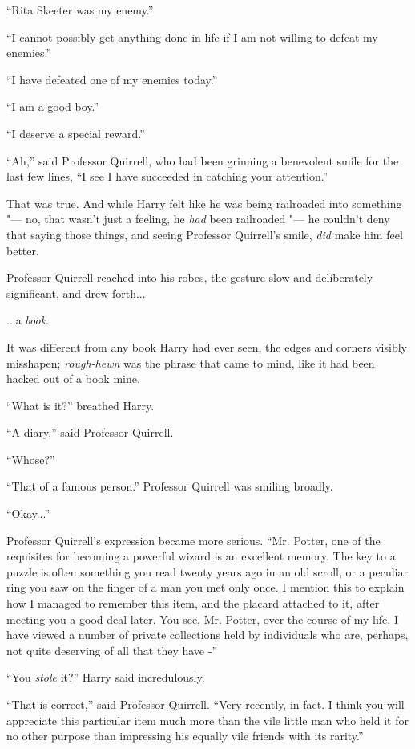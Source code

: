``Rita Skeeter was my enemy.''

``I cannot possibly get anything done in life if I am not willing to
defeat my enemies.''

``I have defeated one of my enemies today.''

``I am a good boy.''

``I deserve a special reward.''

``Ah,'' said Professor Quirrell, who had been grinning a benevolent
smile for the last few lines, ``I see I have succeeded in catching your
attention.''

That was true. And while Harry felt like he was being railroaded into
something "--- no, that wasn't just a feeling, he \emph{had} been
railroaded "--- he couldn't deny that saying those things, and seeing
Professor Quirrell's smile, \emph{did} make him feel better.

Professor Quirrell reached into his robes, the gesture slow and
deliberately significant, and drew forth...

...a \emph{book}.

It was different from any book Harry had ever seen, the edges and
corners visibly misshapen; \emph{rough-hewn} was the phrase that came to
mind, like it had been hacked out of a book mine.

``What is it?'' breathed Harry.

``A diary,'' said Professor Quirrell.

``Whose?''

``That of a famous person.'' Professor Quirrell was smiling broadly.

``Okay...''

Professor Quirrell's expression became more serious. ``Mr. Potter, one
of the requisites for becoming a powerful wizard is an excellent memory.
The key to a puzzle is often something you read twenty years ago in an
old scroll, or a peculiar ring you saw on the finger of a man you met
only once. I mention this to explain how I managed to remember this
item, and the placard attached to it, after meeting you a good deal
later. You see, Mr. Potter, over the course of my life, I have viewed a
number of private collections held by individuals who are, perhaps, not
quite deserving of all that they have -''

``You \emph{stole} it?'' Harry said incredulously.

``That is correct,'' said Professor Quirrell. ``Very recently, in fact.
I think you will appreciate this particular item much more than the vile
little man who held it for no other purpose than impressing his equally
vile friends with its rarity.''

